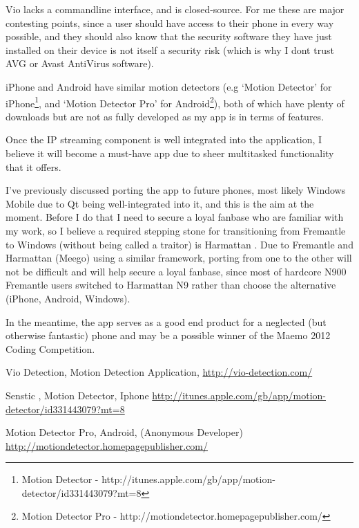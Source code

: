 \documentclass[11pt]{article} %
\begin{document}
Vio lacks a commandline interface, and is closed-source. For me these are major contesting points, since a user should have access to their phone in every way possible, and they should also know that the security software they have just installed on their device is not itself a security risk (which is why I dont trust AVG or Avast AntiVirus software).

iPhone and Android have similar motion detectors (e.g ‘Motion Detector’ for iPhone\footnote{Motion Detector - http://itunes.apple.com/gb/app/motion-detector/id331443079?mt=8}, and ‘Motion Detector Pro’ for Android\footnote{Motion Detector Pro - http://motiondetector.homepagepublisher.com/}), both of which have plenty of downloads but are not as fully developed as my app is in terms of features.

Once the IP streaming component is well integrated into the application, I believe it will become a must-have app due to sheer multitasked functionality that it offers.

I’ve previously discussed porting the app to future phones, most likely Windows Mobile due to Qt being well-integrated into it, and this is the aim at the moment. Before I do that I need to secure a loyal fanbase who are familiar with my work, so I believe a required stepping stone for transitioning from Fremantle to Windows (without being called a traitor) is Harmattan . Due to Fremantle and Harmattan (Meego) using a similar framework, porting from one to the other will not be difficult and will help secure a loyal fanbase, since most of hardcore N900 Fremantle users switched to Harmattan N9 rather than choose the alternative (iPhone, Android, Windows).

In the meantime, the app serves as a good end product for a neglected (but otherwise fantastic) phone and may be a possible winner of the Maemo 2012 Coding Competition.

\begin{thebibliography}{9}

Vio Detection, Motion Detection Application,
\url{http://vio-detection.com/}

Senstic , Motion Detector, Iphone
\url{http://itunes.apple.com/gb/app/motion-detector/id331443079?mt=8}

Motion Detector Pro, Android, (Anonymous Developer)
\url{http://motiondetector.homepagepublisher.com/}

\end{thebibliography}
\end{document}
